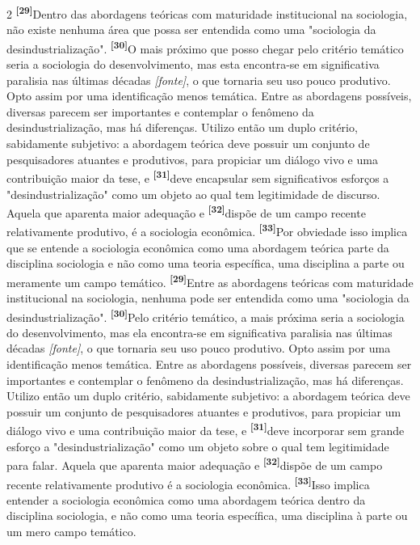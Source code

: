 \documentclass[10pt]{article}
\newcommand{\num}[2]{\textsuperscript{\textbf{\color{#1}[#2]}}}
\newcommand{\chgA}[2]{\num{antes}{#1}{\color{antes}#2}}
\newcommand{\chgD}[2]{\num{depois}{#1}{\color{depois}#2}}
\newcommand{\nota}[1]{{\color{cita}\small\textit{[#1]}}}
\begin{document}
\begin{paracol}{2}
\chgA{29}{Dentro das abordagens teóricas com maturidade institucional na sociologia, não existe nenhuma área que possa ser entendida} como uma
"sociologia da desindustrialização". \chgA{30}{O mais próximo que posso chegar pelo critério temático seria a sociologia do desenvolvimento, mas esta} encontra-se em significativa paralisia nas últimas décadas \nota{fonte}, o que tornaria seu uso
pouco produtivo. Opto assim por uma identificação menos temática. Entre as abordagens possíveis, diversas parecem ser importantes e contemplar o fenômeno da desindustrialização, 
mas há diferenças. Utilizo então um duplo critério, sabidamente subjetivo: a abordagem teórica deve possuir um conjunto de pesquisadores
atuantes e produtivos, para propiciar um diálogo vivo e uma contribuição maior da tese, e \chgA{31}{deve encapsular sem
significativos esforços a "desindustrialização" como um objeto ao qual tem legitimidade de discurso.} Aquela que aparenta maior adequação 
e \chgA{32}{dispõe de um campo recente relativamente produtivo, é a sociologia econômica.} \chgA{33}{Por obviedade isso implica
que se entende a sociologia econômica como uma abordagem teórica parte da disciplina sociologia e não como uma teoria específica,
uma disciplina a parte ou meramente um campo temático.}
\switchcolumn[1]
\chgD{29}{Entre as abordagens teóricas com maturidade institucional na sociologia, nenhuma pode ser entendida} como uma
"sociologia da desindustrialização". \chgD{30}{Pelo critério temático, a mais próxima seria a sociologia do desenvolvimento, mas ela} encontra-se em significativa paralisia nas últimas décadas \nota{fonte}, o que tornaria seu uso
pouco produtivo. Opto assim por uma identificação menos temática. Entre as abordagens possíveis, diversas parecem ser importantes e contemplar o fenômeno da desindustrialização, 
mas há diferenças. Utilizo então um duplo critério, sabidamente subjetivo: a abordagem teórica deve possuir um conjunto de pesquisadores
atuantes e produtivos, para propiciar um diálogo vivo e uma contribuição maior da tese, e \chgD{31}{deve incorporar sem grande esforço a "desindustrialização" como um objeto sobre o qual tem legitimidade para falar.} Aquela que aparenta maior adequação 
e \chgD{32}{dispõe de um campo recente relativamente produtivo é a sociologia econômica.} \chgD{33}{Isso implica entender a sociologia econômica como uma abordagem teórica dentro da disciplina sociologia, e não como uma teoria específica, uma disciplina à parte ou um mero campo temático.}

\end{paracol}
\end{document}
